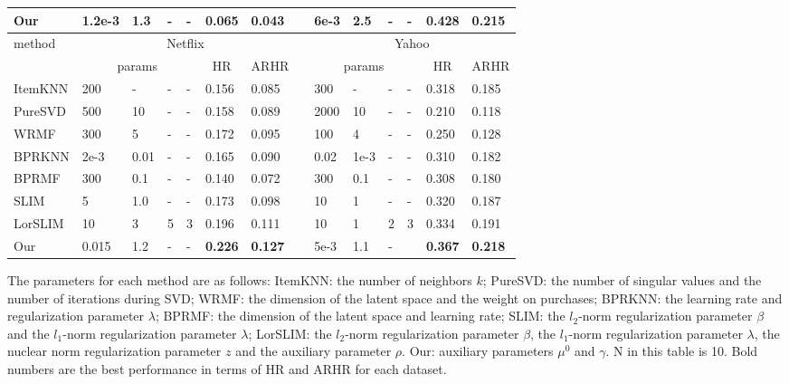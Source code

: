 \documentclass[letterpaper]{article}
\begin{document}
\begin{table}[ht]
\begin{center}
\begin{threeparttable}
\begin{tabular}{llllllllllllll}
Our&1.2e-3&1.3&-&-&\bf{0.065}&\bf{0.043}&&6e-3&2.5&-&-&\bf{0.428}&\bf{0.215}\\
\hline\hline
\multirow{2}{*}{method} &
\multicolumn{6}{c}{Netflix} &
\multicolumn{1}{c}{}&
\multicolumn{6}{c}{Yahoo} \\
\cline{2-7} \cline{9-14}
& \multicolumn{4}{c}{params} &\multicolumn{1}{c}{HR}  & \multicolumn{1}{c}{ARHR} &\multicolumn{1}{c}{}&\multicolumn{4}{c}{params} &\multicolumn{1}{c}{HR}  & \multicolumn{1}{c}{ARHR} \\
\hline
ItemKNN&200&-&-&-&0.156&0.085&&300&-&-&-&0.318&0.185\\
PureSVD&500&10&-&-&0.158&0.089&&2000&10&-&-&0.210&0.118\\
WRMF&300&5&-&-&0.172&0.095&&100&4&-&-&0.250&0.128\\
BPRKNN&2e-3&0.01&-&-&0.165&0.090&&0.02&1e-3&-&-&0.310&0.182\\
BPRMF&300&0.1&-&-&0.140&0.072&&300&0.1&-&-&0.308&0.180\\
SLIM&5&1.0&-&-&0.173&0.098&&10&1&-&-&0.320&0.187\\
LorSLIM&10&3&5&3&0.196&0.111&&10&1&2&3&0.334&0.191\\
Our&0.015&1.2&-&-&\bf{0.226}&\bf{0.127}&&5e-3&1.1&-&&\bf{0.367}&\bf{0.218}\\
\hline
\end{tabular}%

\begin{tablenotes}


\item The parameters for each method are as follows: ItemKNN: the number of neighbors $k$; PureSVD: the number of singular values and the number of iterations during SVD; WRMF: the dimension of the latent space and the weight on purchases; BPRKNN: the learning rate and regularization parameter $\lambda$; BPRMF: the dimension of the latent space and learning rate; SLIM: the $l_2$-norm regularization parameter $\beta$ and the $l_1$-norm regularization parameter
$\lambda$; LorSLIM: the $l_2$-norm regularization parameter $\beta$, the $l_1$-norm regularization parameter $\lambda$, the nuclear norm regularization parameter $z$ and the auxiliary parameter $\rho$. Our: auxiliary parameters $\mu^0$ and $\gamma$. N in this table is 10. Bold numbers are the best performance in terms of HR and ARHR for each dataset.

\end{tablenotes}
\end{threeparttable}
\end{center}
\end{table}
\end{document}
